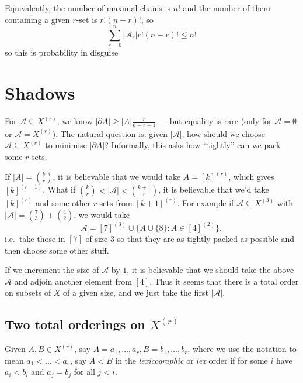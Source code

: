 \documentclass[a4paper]{article}
\newcommand{\shadow}{\partial}
\begin{document}
\begin{remark}
  Equivalently, the number of maximal chains is \(n!\) and the number of them containing a given \(r\)-set is \(r! (n - r)!\), so
  \[
    \sum_{r = 0}^n |\mathcal A_r| r! (n - r)! \leq n!
  \]
  so this is probability in disguise
\end{remark}

\section{Shadows}

For \(\mathcal A \subseteq X^{(r)}\), we know \(|\shadow A| \geq |A| \frac{r}{n - r + 1}\) --- but equality is rare (only for \(\mathcal A = \emptyset\) or \(\mathcal A = X^{(r)}\)). The natural question is: given \(|\mathcal A|\), how should we choose \(\mathcal A \subseteq X^{(r)}\) to minimise \(|\shadow A|\)? Informally, this asks how ``tightly'' can we pack some \(r\)-sets.

If \(|A| = \binom{k}{r}\), it is believable that we would take \(A = [k]^{(r)}\), which gives \([k]^{(r - 1)}\). What if \(\binom{k}{r} < |\mathcal A| <\binom{k + 1}{r}\), it is believable that we'd take \([k]^{(r)}\) and some other \(r\)-sets from \([k + 1]^{(r)}\). For example if \(\mathcal A \subseteq X^{(3)}\) with \(|\mathcal A| = \binom{7}{3} + \binom{4}{2}\), we would take
\[
  \mathcal A = [7]^{(3)} \cup \{A \cup \{8\}: A \in [4]^{(2)}\},
\]
i.e.\ take those in \([7]\) of size \(3\) so that they are as tightly packed as possible and then choose some other stuff.

If we increment the size of \(\mathcal A\) by \(1\), it is believable that we should take the above \(\mathcal A\) and adjoin another element from \([4]\). Thus it seems that there is a total order on subsets of \(X\) of a given size, and we just take the first \(|\mathcal A|\).

\subsection{Two total orderings on \(X^{(r)}\)}

\begin{definition}
  Given \(A, B \in X^{(r)}\), say \(A = a_1, \dots, a_r, B = b_1, \dots, b_r\), where we use the notation to mean \(a_1 < \dots < a_r\), say \(A < B\) in the \emph{lexicographic} or \emph{lex} order if for some \(i\) have \(a_i < b_i\) and \(a_j = b_j\) for all \(j < i\).
\end{definition}
\end{document}
